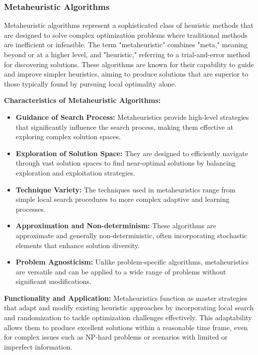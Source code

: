 \documentclass[
]{article}
\begin{document}
\hypertarget{nadpis-uxfarovnux11b-3-3}{%
\subsubsection{Metaheuristic Algorithms}\label{nadpis-uxfarovnux11b-3-3}}

Metaheuristic algorithms represent a sophisticated class of heuristic methods that are designed to solve complex optimization problems where traditional methods are inefficient or infeasible. The term "metaheuristic" combines "meta," meaning beyond or at a higher level, and "heuristic," referring to a trial-and-error method for discovering solutions. These algorithms are known for their capability to guide and improve simpler heuristics, aiming to produce solutions that are superior to those typically found by pursuing local optimality alone.

\textbf{Characteristics of Metaheuristic Algorithms:}
\begin{itemize}
    \item \textbf{Guidance of Search Process:} Metaheuristics provide high-level strategies that significantly influence the search process, making them effective at exploring complex solution spaces.
    \item \textbf{Exploration of Solution Space:} They are designed to efficiently navigate through vast solution spaces to find near-optimal solutions by balancing exploration and exploitation strategies.
    \item \textbf{Technique Variety:} The techniques used in metaheuristics range from simple local search procedures to more complex adaptive and learning processes.
    \item \textbf{Approximation and Non-determinism:} These algorithms are approximate and generally non-deterministic, often incorporating stochastic elements that enhance solution diversity.
    \item \textbf{Problem Agnosticism:} Unlike problem-specific algorithms, metaheuristics are versatile and can be applied to a wide range of problems without significant modifications.
\end{itemize}

\textbf{Functionality and Application:}
Metaheuristics function as master strategies that adapt and modify existing heuristic approaches by incorporating local search and randomization to tackle optimization challenges effectively. This adaptability allows them to produce excellent solutions within a reasonable time frame, even for complex issues such as NP-hard problems or scenarios with limited or imperfect information.
\end{document}
